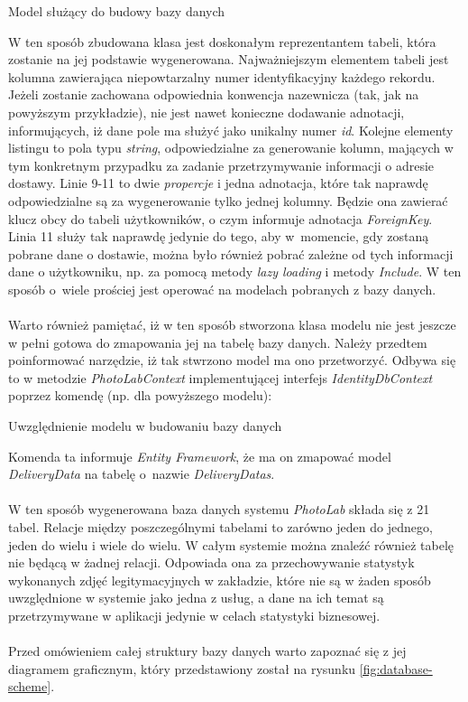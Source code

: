 \begin{listing}[ht]
    \caption{Model służący do budowy bazy danych}
    \label{listing:model-server}
\end{listing}

\noindent W ten sposób zbudowana klasa jest doskonałym reprezentantem tabeli, która zostanie na jej podstawie wygenerowana. Najważniejszym elementem tabeli jest kolumna zawierająca niepowtarzalny numer identyfikacyjny każdego rekordu. Jeżeli zostanie zachowana odpowiednia konwencja nazewnicza (tak, jak na powyższym przykładzie), nie jest nawet konieczne dodawanie adnotacji, informujących, iż dane pole ma służyć jako unikalny numer \textit{id}. Kolejne elementy listingu to pola typu \textit{string}, odpowiedzialne za generowanie kolumn, mających w tym konkretnym przypadku za zadanie przetrzymywanie informacji o adresie dostawy. Linie 9-11 to dwie \textit{propercje} i jedna adnotacja, które tak naprawdę odpowiedzialne są za wygenerowanie tylko jednej kolumny. Będzie ona zawierać klucz obcy do tabeli użytkowników, o czym informuje adnotacja \textit{ForeignKey}. Linia 11 służy tak naprawdę jedynie do tego, aby w~momencie, gdy zostaną pobrane dane o dostawie, można było również pobrać zależne od tych informacji dane o użytkowniku, np. za pomocą metody \textit{lazy loading} i metody \textit{Include}. W ten sposób o~wiele prościej jest operować na modelach pobranych z bazy danych.\\
\\Warto również pamiętać, iż w ten sposób stworzona klasa modelu nie jest jeszcze w pełni gotowa do zmapowania jej na tabelę bazy danych. Należy przedtem poinformować narzędzie, iż tak stwrzono model ma ono przetworzyć. Odbywa się to w metodzie \textit{PhotoLabContext} implementującej interfejs \textit{IdentityDbContext} poprzez komendę (np. dla powyższego modelu):

\begin{listing}[ht]
    \caption{Uwzględnienie modelu w budowaniu bazy danych}
    \label{listing:adding-model-server}
\end{listing}

\noindent Komenda ta informuje \textit{Entity Framework}, że ma on zmapować model \textit{DeliveryData} na tabelę o~nazwie \textit{DeliveryDatas}.\\
\\
W ten sposób wygenerowana baza danych systemu \textit{PhotoLab} składa się z 21 tabel. Relacje między poszczególnymi tabelami to zarówno jeden do jednego, jeden do wielu i wiele do wielu. W całym systemie można znaleźć również tabelę nie będącą w żadnej relacji. Odpowiada ona za przechowywanie statystyk wykonanych zdjęć legitymacyjnych w zakładzie, które nie są w żaden sposób uwzględnione w systemie jako jedna z usług, a dane na ich temat są przetrzymywane w aplikacji jedynie w celach statystyki biznesowej. \\
\\
\noindent Przed omówieniem całej struktury bazy danych warto zapoznać się z jej diagramem graficznym, który przedstawiony został na rysunku \ref{fig:database-scheme}.


